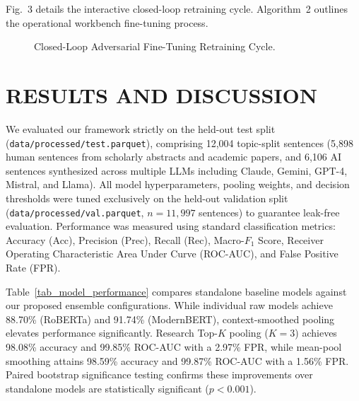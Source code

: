 \documentclass[conference]{IEEEtran}
\begin{document}
Fig.~3 details the interactive closed-loop retraining cycle. Algorithm~2 outlines the operational workbench fine-tuning process.

\begin{figure}[htbp]
\centerline{}
\caption{Closed-Loop Adversarial Fine-Tuning Retraining Cycle.}
\label{fig_closed_loop}
\end{figure}

\section{RESULTS AND DISCUSSION}
We evaluated our framework strictly on the held-out test split (\texttt{data/processed/test.parquet}), comprising 12,004 topic-split sentences (5,898 human sentences from scholarly abstracts and academic papers, and 6,106 AI sentences synthesized across multiple LLMs including Claude, Gemini, GPT-4, Mistral, and Llama). All model hyperparameters, pooling weights, and decision thresholds were tuned exclusively on the held-out validation split (\texttt{data/processed/val.parquet}, $n=11,997$ sentences) to guarantee leak-free evaluation. Performance was measured using standard classification metrics: Accuracy (Acc), Precision (Prec), Recall (Rec), Macro-$F_1$ Score, Receiver Operating Characteristic Area Under Curve (ROC-AUC), and False Positive Rate (FPR).

Table~\ref{tab_model_performance} compares standalone baseline models against our proposed ensemble configurations. While individual raw models achieve 88.70\% (RoBERTa) and 91.74\% (ModernBERT), context-smoothed pooling elevates performance significantly. Research Top-$K$ pooling ($K=3$) achieves 98.08\% accuracy and 99.85\% ROC-AUC with a 2.97\% FPR, while mean-pool smoothing attains 98.59\% accuracy and 99.87\% ROC-AUC with a 1.56\% FPR. Paired bootstrap significance testing confirms these improvements over standalone models are statistically significant ($p < 0.001$).
\end{document}
